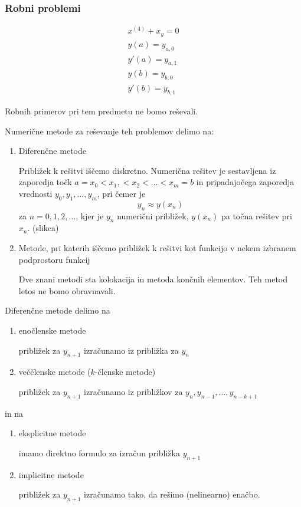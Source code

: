 \documentclass[a4paper,12pt]{article}
\theoremstyle{definition}
\theoremstyle{remark}
\begin{document}
\subsubsection*{Robni problemi}

\begin{gather*}
    x^{(4)} + x_y = 0 \\
    y(a) = y_{a, 0} \\
    y'(a) = y_{a, 1} \\
    y(b) = y_{b, 0} \\
    y'(b) = y_{b, 1}
\end{gather*}

Robnih primerov pri tem predmetu ne bomo reševali.

Numerične metode za reševanje teh problemov delimo na:

\begin{enumerate}
    \item Diferenčne metode
    
    Približek k rešitvi iščemo diskretno. Numerična rešitev je sestavljena iz zaporedja točk $a = x_0 < x_1, < x_2 < \dots < x_m = b$ in pripadajočega
    zaporedja vrednosti $y_0, y_1, \dots, y_m$, pri čemer je 
    \begin{equation*}
        y_n \approx y(x_n)
    \end{equation*}
    za $n = 0, 1, 2, \dots$, kjer je $y_n$ numerični približek, $y(x_n)$ pa točna rešitev pri $x_n$.
    (slikca)
    \item Metode, pri katerih iščemo približek k rešitvi kot funkcijo v nekem izbranem podprostoru funkcij
    
    Dve znani metodi sta kolokacija in metoda končnih elementov. Teh metod letos ne bomo obravnavali.
\end{enumerate}


Diferenčne metode delimo na
\begin{enumerate}
    \item enočlenske metode
    
    približek za $y_{n+1}$ izračunamo iz približka za $y_n$
    \item veččlenske metode ($k$-členske metode)
    
    približek za $y_{n+1}$ izračunamo iz približkov za $y_n, y_{n-1}, \dots, y_{n-k+1}$
\end{enumerate}
in na
\begin{enumerate}
    \item eksplicitne metode
    
    imamo direktno formulo za izračun približka $y_{n+1}$
    \item implicitne metode
    
    približek za $y_{n+1}$ izračunamo tako, da rešimo (nelinearno) enačbo.
\end{enumerate}
\end{document}
